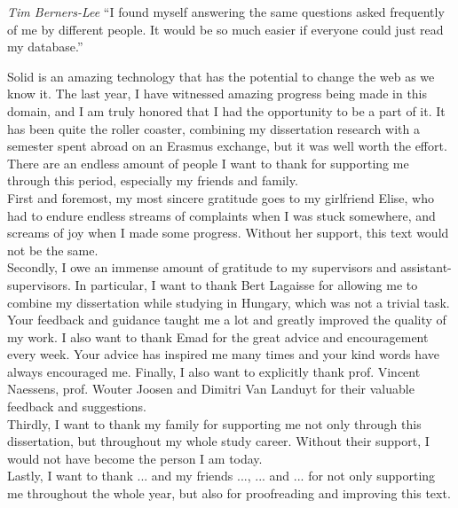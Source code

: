 \begin{preface}
\begin{fancyquote}{\textit{Tim Berners-Lee}}
``I found myself answering the same questions asked frequently of me by different people. It would be so much easier if everyone could just read my database.''
\end{fancyquote}

\noindent Solid is an amazing technology that has the potential to change the web as we know it. The last year, I have witnessed amazing progress being made in this domain, and I am truly honored that I had the opportunity to be a part of it. It has been quite the roller coaster, combining my dissertation research with a semester spent abroad on an Erasmus exchange, but it was well worth the effort.\\

\noindent There are an endless amount of people I want to thank for supporting me through this period, especially my friends and family.\\

\noindent First and foremost, my most sincere gratitude goes to my girlfriend Elise, who had to endure endless streams of complaints when I was stuck somewhere, and screams of joy when I made some progress. Without her support, this text would not be the same.\\

\noindent Secondly, I owe an immense amount of gratitude to my supervisors and assistant-supervisors. 
In particular, I want to thank Bert Lagaisse for allowing me to combine my dissertation while studying in Hungary, which was not a trivial task. Your feedback and guidance taught me a lot and greatly improved the quality of my work. I also want to thank Emad for the great advice and encouragement every week. Your advice has inspired me many times and your kind words have always encouraged me. Finally, I also want to explicitly thank prof. Vincent Naessens, prof. Wouter Joosen and Dimitri Van Landuyt for their valuable feedback and suggestions.\\

\noindent Thirdly, I want to thank my family for supporting me not only through this dissertation, but throughout my whole study career. Without their support, I would not have become the person I am today.\\

\noindent Lastly, I want to thank ... and my friends ..., ... and ... for not only supporting me throughout the whole year, but also for proofreading and improving this text. 

\end{preface}